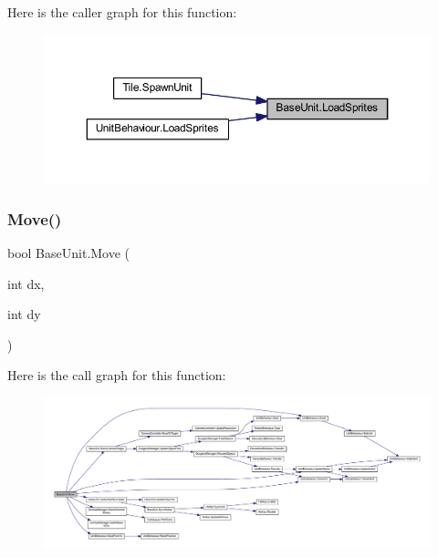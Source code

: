 Here is the caller graph for this function\+:\nopagebreak
\begin{figure}[H]
\begin{center}
\leavevmode
\includegraphics[width=350pt]{class_base_unit_ab93bf1d3c3ca2899d591a936760d46cf_icgraph}
\end{center}
\end{figure}
\mbox{\label{class_base_unit_af7d5e0c6e087b3e5c8af203dfb11268b}} 
\subsubsection{\texorpdfstring{Move()}{Move()}}
{\footnotesize\ttfamily bool Base\+Unit.\+Move (\begin{DoxyParamCaption}\item[{int}]{dx,  }\item[{int}]{dy }\end{DoxyParamCaption})}

Here is the call graph for this function\+:\nopagebreak
\begin{figure}[H]
\begin{center}
\leavevmode
\includegraphics[width=350pt]{class_base_unit_af7d5e0c6e087b3e5c8af203dfb11268b_cgraph}
\end{center}
\end{figure}
\mbox{\label{class_base_unit_a8412f2b3e8ec9c3ff75b41b830fde443}} 
